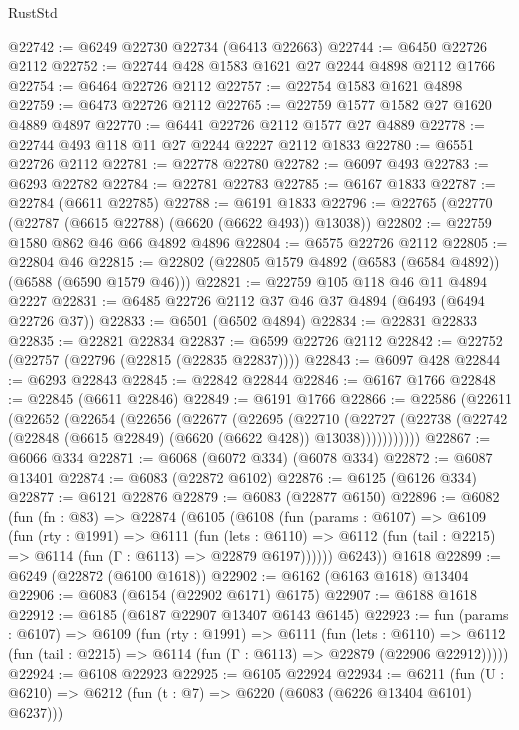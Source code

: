\begin{lexlean}{RustStd}
\begin{coremodule}
@22742 := @6249 @22730 @22734 (@6413 @22663)
@22744 := @6450 @22726 @2112
@22752 := @22744 @428 @1583 @1621 @27 @2244 @4898 @2112 @1766
@22754 := @6464 @22726 @2112
@22757 := @22754 @1583 @1621 @4898
@22759 := @6473 @22726 @2112
@22765 := @22759 @1577 @1582 @27 @1620 @4889 @4897
@22770 := @6441 @22726 @2112 @1577 @27 @4889
@22778 := @22744 @493 @118 @11 @27 @2244 @2227 @2112 @1833
@22780 := @6551 @22726 @2112
@22781 := @22778 @22780
@22782 := @6097 @493
@22783 := @6293 @22782
@22784 := @22781 @22783
@22785 := @6167 @1833
@22787 := @22784 (@6611 @22785)
@22788 := @6191 @1833
@22796 := @22765 (@22770 (@22787 (@6615 @22788) (@6620 (@6622 @493)) @13038))
@22802 := @22759 @1580 @862 @46 @66 @4892 @4896
@22804 := @6575 @22726 @2112
@22805 := @22804 @46
@22815 := @22802 (@22805 @1579 @4892 (@6583 (@6584 @4892)) (@6588 (@6590 @1579 @46)))
@22821 := @22759 @105 @118 @46 @11 @4894 @2227
@22831 := @6485 @22726 @2112 @37 @46 @37 @4894 (@6493 (@6494 @22726 @37))
@22833 := @6501 (@6502 @4894)
@22834 := @22831 @22833
@22835 := @22821 @22834
@22837 := @6599 @22726 @2112
@22842 := @22752 (@22757 (@22796 (@22815 (@22835 @22837))))
@22843 := @6097 @428
@22844 := @6293 @22843
@22845 := @22842 @22844
@22846 := @6167 @1766
@22848 := @22845 (@6611 @22846)
@22849 := @6191 @1766
@22866 := @22586
    (@22611
      (@22652
        (@22654
          (@22656
            (@22677
              (@22695
                (@22710
                  (@22727
                    (@22738 (@22742 (@22848 (@6615 @22849) (@6620 (@6622 @428)) @13038)))))))))))
@22867 := @6066 @334
@22871 := @6068 (@6072 @334) (@6078 @334)
@22872 := @6087 @13401
@22874 := @6083 (@22872 @6102)
@22876 := @6125 (@6126 @334)
@22877 := @6121 @22876
@22879 := @6083 (@22877 @6150)
@22896 := @6082
    (fun (fn : @83) =>
    @22874
      (@6105
        (@6108
          (fun (params : @6107) =>
          @6109
            (fun (rty : @1991) =>
            @6111
              (fun (lets : @6110) =>
              @6112 (fun (tail : @2215) => @6114 (fun (Γ : @6113) => @22879 @6197))))))
        @6243))
    @1618
@22899 := @6249 (@22872 (@6100 @1618))
@22902 := @6162 (@6163 @1618) @13404
@22906 := @6083 (@6154 (@22902 @6171) @6175)
@22907 := @6188 @1618
@22912 := @6185 (@6187 @22907 @13407 @6143 @6145)
@22923 := fun (params : @6107) =>
  @6109
    (fun (rty : @1991) =>
    @6111
      (fun (lets : @6110) =>
      @6112 (fun (tail : @2215) => @6114 (fun (Γ : @6113) => @22879 (@22906 @22912)))))
@22924 := @6108 @22923
@22925 := @6105 @22924
@22934 := @6211
    (fun (U : @6210) => @6212 (fun (t : @7) => @6220 (@6083 (@6226 @13404 @6101) @6237)))

\end{coremodule}
\end{lexlean}
